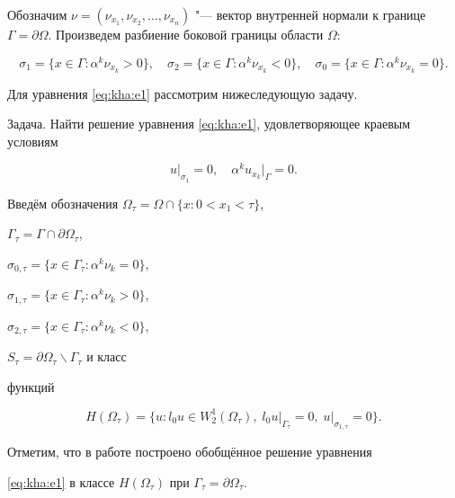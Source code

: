 Обозначим $ \nu=(\nu_{x_1}, \nu_{x_2}, \dots, \nu_{x_n})$  "--- вектор внутренней нормали к границе $\Gamma=\partial \Omega.$ Произведем разбиение боковой границы области $\Omega$:

$$\sigma_1=\{x\in\Gamma:\alpha^k \nu_{x_k}>0\},\quad 

\sigma_2=\{x\in\Gamma:\alpha^k \nu_{x_k}<0\},\quad 

\sigma_0=\{x\in\Gamma:\alpha^k \nu_{x_k}=0\}.$$



Для уравнения \eqref{eq:kha:e1} рассмотрим нижеследующую задачу.



\smallskip

{\small \sc Задача.} Найти решение уравнения \eqref{eq:kha:e1}, удовлетворяющее краевым условиям

\begin{equation}

u\big|_{\sigma_1}=0,\quad   \alpha^k u_{x_k}\big|_{\Gamma}=0.\label{eq:kha:e3}

\end{equation}

\smallskip





Введём обозначения $\Omega_\tau=\Omega\cap\{x: 0<x_1<\tau\}$, 

$\Gamma_\tau=\Gamma\cap\partial\Omega_\tau$,

$\sigma_{0,\tau}=\{x\in\Gamma_\tau:\alpha^k\nu_k=0\}$,

$\sigma_{1,\tau}=\{x\in\Gamma_\tau: \alpha^k\nu_k>0\}$,

$\sigma_{2,\tau}=\{x\in\Gamma_\tau:\alpha^k\nu_k<0\}$,

$S_\tau=\partial\Omega_{\tau}\backslash\Gamma_{\tau}$ и класс

функций 

\begin{equation}\label{eq:kha:e4}

H(\Omega_\tau)= \bigl\{u : l_0u\in W_2^1(\Omega_\tau), \; l_0 u\big|_{\Gamma_\tau}=0, \; u\big|_{\sigma_{1,\tau}}=0 \bigr\}.

\end{equation}

Отметим, что в работе  \cite{khashimovl:bib:Kojan} построено обобщённое решение уравнения

\eqref{eq:kha:e1} в классе $H(\Omega_\tau)$ при $\Gamma_\tau=\partial\Omega_\tau$.



